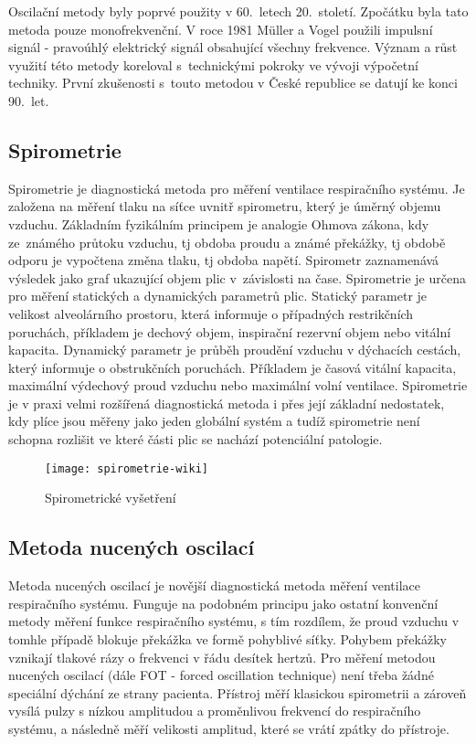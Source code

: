 Oscilační metody byly poprvé použity v 60.~letech 20.~století. Zpočátku byla tato metoda pouze monofrekvenční. V roce 1981 Müller a Vogel použili impulsní signál - pravoúhlý elektrický signál obsahující všechny frekvence. Význam a růst využití této metody koreloval s~technickými pokroky ve vývoji výpočetní techniky. První zkušenosti s~touto metodou v České republice se datují ke konci 90.~let. 

\subsection{Spirometrie}
Spirometrie je diagnostická metoda pro měření ventilace respiračního systému. Je založena na měření tlaku na síťce uvnitř spirometru, který je úměrný objemu vzduchu. \cite{MEFANET} Základním fyzikálním principem je analogie Ohmova zákona, kdy ze~zná\-mé\-ho průtoku vzduchu, tj obdoba proudu a známé překážky, tj obdobě odporu je vypočtena změna tlaku, tj obdoba napětí. Spirometr zaznamenává výsledek jako graf ukazující objem plic v~závislosti na čase. \cite{Medicon} Spirometrie je určena pro měření statických a dynamických parametrů plic. Statický parametr  je velikost alveolárního prostoru, která informuje o případných restrikčních poruchách, příkladem je dechový objem, inspirační rezervní objem nebo vitální kapacita. Dynamický parametr je průběh proudění vzduchu v dýchacích cestách, který informuje o obstrukčních poruchách. Příkladem je časová vitální kapacita, maximální výdechový proud vzduchu nebo maximální volní ventilace. \cite{lekfak}
Spirometrie je v praxi velmi rozšířená diagnostická metoda i přes její základní nedostatek, kdy plíce jsou měřeny jako jeden globální systém a tudíž spirometrie není schopna rozlišit ve které části plic se nachází potenciální patologie.
\begin{figure}[!ht]
			\centering
 			\texttt{[image: spirometrie-wiki]}
			\caption{Spirometrické vyšetření \cite{spirowiki}}
			 \label{vysetreni}
 \end{figure}

\subsection{Metoda nucených oscilací}
Metoda nucených oscilací je novější diagnostická metoda měření ventilace respiračního systému. Funguje na podobném principu jako ostatní konvenční metody měření funkce respiračního systému, s tím rozdílem, že proud vzduchu v tomhle případě blokuje překážka ve formě pohyblivé síťky. Pohybem překážky vznikají tlakové rázy o frekvenci v řádu desítek hertzů. Pro měření metodou nucených oscilací (dále FOT - forced oscillation technique) není třeba žádné speciální dýchání ze strany pacienta. Přístroj měří klasickou spirometrii a zároveň vysílá pulzy s nízkou amplitudou a proměnlivou frekvencí do respiračního systému, a následně měří velikosti amplitud, které se vrátí zpátky do přístroje. \cite{Oostveen}

